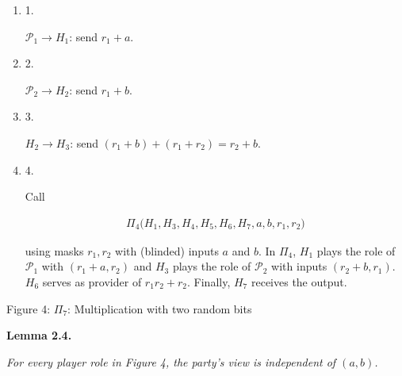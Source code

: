 \documentclass[10pt,a4paper]{article}
\begin{document}
\begin{enumerate}


\item[] 
1. 


$\mathcal{P}_{1}\rightarrow H_{1}$: send $r_{1}+a$.\par





\item[] 
2. 


$\mathcal{P}_{2}\rightarrow H_{2}$: send $r_{1}+b$.\par





\item[] 
3. 


$H_{2}\rightarrow H_{3}$: send $(r_{1}+b)+(r_{1}+r_{2})=r_{2}+b$.\par





\item[] 
4. 


Call\par


\[\begin{gathered}
\Pi_{4}\bigl(H_{1},H_{3},H_{4},H_{5},H_{6},H_{7},a,b,r_{1},r_{2}\bigr)
\end{gathered}\]


using masks $r_{1},r_{2}$ with (blinded) inputs $a$ and $b$. In $\Pi_{4}$, $H_{1}$ plays the role of $\mathcal{P}_{1}$ with $(r_{1}+a,r_{2})$ and $H_{3}$ plays the role of $\mathcal{P}_{2}$ with inputs $(r_{2}+b,r_{1})$. $H_{6}$ serves as provider of $r_{1}r_{2}+r_{2}$. Finally, $H_{7}$ receives the output.\par





\end{enumerate}


Figure 4: $\Pi_{7}$: Multiplication with two random bits




\par\medskip\noindent\textbf{
\textbf{Lemma 2.4}\textbf{.}
}\par



\emph{For every player role in Figure 4, the party’s view is independent of $(a,b)$.}\par
\end{document}
